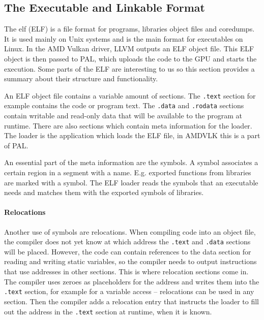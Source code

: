 \begin{figure}
	\centering
	
\end{figure}

\subsection{The Executable and Linkable Format}
\label{sub:elf}
The \glsdesc{elf} (ELF) is a file format for programs, libraries object files and coredumps. It is used mainly on Unix systems and is the main format for executables on Linux.
In the AMD Vulkan driver, LLVM outputs an ELF object file. This ELF object is then passed to PAL, which uploads the code to the GPU and starts the execution. Some parts of the ELF are interesting to us so this section provides a summary about their structure and functionality.

An ELF object file contains a variable amount of sections. The \texttt{.text} section for example contains the code or program text. The \texttt{.data} and \texttt{.rodata} sections contain writable and read-only data that will be available to the program at runtime. There are also sections which contain meta information for the loader. The loader is the application which loads the ELF file, in AMDVLK this is a part of PAL.

An essential part of the meta information are the symbols. A symbol associates a certain region in a segment with a name. E.g. exported functions from libraries are marked with a symbol. The ELF loader reads the symbols that an executable needs and matches them with the exported symbols of libraries.

\paragraph{Relocations} Another use of symbols are relocations. When compiling code into an object file, the compiler does not yet know at which address the \texttt{.text} and \texttt{.data} sections will be placed. However, the code can contain references to the data section for reading and writing static variables, so the compiler needs to output instructions that use addresses in other sections. This is where relocation sections come in. The compiler uses zeroes as  placeholders for the address and writes them into the \texttt{.text} section, for example for a variable access -- relocations can be used in any section. Then the compiler adds a relocation entry that instructs the loader to fill out the address in the \texttt{.text} section at runtime, when it is known.

